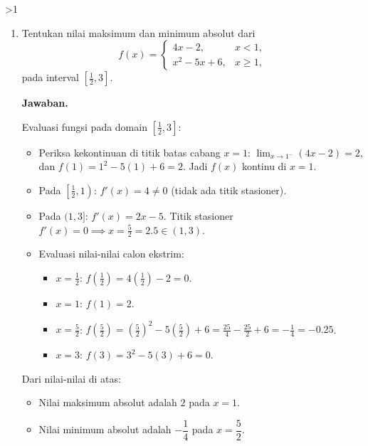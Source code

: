 \documentclass[12pt]{article}
\newcommand{\answername}{Jawaban}
\newenvironment{soaljawab}[1]{%
    \ifnum#1>1\clearpage\fi
    \begin{tcolorbox}[enhanced,breakable,height fill,height fixed for=all,
        sharp corners,colback=white,colframe=black,boxrule=0.4bp,
        boxsep=0pt,left=12bp,right=12bp,top=6bp,bottom=10bp,
        before skip=0pt,after skip=0pt,pad at break=8bp]
    \fontsize{12bp}{14bp}\selectfont
    \setlength{\abovedisplayskip}{8bp}
    \setlength{\belowdisplayskip}{8bp}
    \setlength{\abovedisplayshortskip}{8bp}
    \setlength{\belowdisplayshortskip}{8bp}
    \renewcommand{\arraystretch}{1.15}
    \begin{enumerate}[start=#1,topsep=0pt]
}{%
    \end{enumerate}
    \end{tcolorbox}
}
\newcommand{\jawaban}{\par\medskip\textbf{\answername.}\par\smallskip}
\begin{document}
\begin{soaljawab}{2}
\item Tentukan nilai maksimum dan minimum absolut dari
        \[
          f(x) = \begin{cases}
            4x - 2,       & x < 1,   \\
            x^2 - 5x + 6, & x \ge 1,
          \end{cases}
        \]
        pada interval $\left[\frac{1}{2}, 3\right]$.
\jawaban
Evaluasi fungsi pada domain $\left[\frac{1}{2}, 3\right]$:
        \begin{itemize}
          \item Periksa kekontinuan di titik batas cabang $x = 1$:
                $\displaystyle \lim_{x \to 1^-} (4x - 2) = 2$, dan $f(1) = 1^2 - 5(1) + 6 = 2$. Jadi $f(x)$ kontinu di $x = 1$.
          \item Pada $\left[\frac{1}{2}, 1\right)$: $f'(x) = 4 \ne 0$ (tidak ada titik stasioner).
          \item Pada $(1, 3]$: $f'(x) = 2x - 5$. Titik stasioner $f'(x) = 0 \implies x = \frac{5}{2} = 2.5 \in (1, 3)$.
          \item Evaluasi nilai-nilai calon ekstrim:
                \begin{itemize}
                  \item $x = \frac{1}{2}$: $f\left(\frac{1}{2}\right) = 4\left(\frac{1}{2}\right) - 2 = 0$.
                  \item $x = 1$: $f(1) = 2$.
                  \item $x = \frac{5}{2}$: $f\left(\frac{5}{2}\right) = \left(\frac{5}{2}\right)^2 - 5\left(\frac{5}{2}\right) + 6 = \frac{25}{4} - \frac{25}{2} + 6 = -\frac{1}{4} = -0.25$.
                  \item $x = 3$: $f(3) = 3^2 - 5(3) + 6 = 0$.
                \end{itemize}
        \end{itemize}
        Dari nilai-nilai di atas:
        \begin{itemize}
          \item Nilai maksimum absolut adalah $2$ pada $x = 1$.
          \item Nilai minimum absolut adalah $-\dfrac{1}{4}$ pada $x = \dfrac{5}{2}$.
        \end{itemize}
\end{soaljawab}
\end{document}
